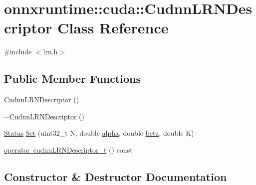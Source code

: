 \hypertarget{classonnxruntime_1_1cuda_1_1CudnnLRNDescriptor}{}\section{onnxruntime\+:\+:cuda\+:\+:Cudnn\+L\+R\+N\+Descriptor Class Reference}
\label{classonnxruntime_1_1cuda_1_1CudnnLRNDescriptor}


{\ttfamily \#include $<$lrn.\+h$>$}

\subsection*{Public Member Functions}
\begin{DoxyCompactItemize}
\item 
\mbox{\hyperlink{classonnxruntime_1_1cuda_1_1CudnnLRNDescriptor_a598f4a66afc45a75c4c8edf863a0514f}{Cudnn\+L\+R\+N\+Descriptor}} ()
\item 
\mbox{\hyperlink{classonnxruntime_1_1cuda_1_1CudnnLRNDescriptor_ac02e80017f5841d5a864269db0e8d437}{$\sim$\+Cudnn\+L\+R\+N\+Descriptor}} ()
\item 
\mbox{\hyperlink{classonnxruntime_1_1common_1_1Status}{Status}} \mbox{\hyperlink{classonnxruntime_1_1cuda_1_1CudnnLRNDescriptor_afef51817e25778067c60d5de09fea530}{Set}} (uint32\+\_\+t N, double \mbox{\hyperlink{mlasi_8h_a1763355f32e1812e5cb3a0080e7cca12}{alpha}}, double \mbox{\hyperlink{mlasi_8h_a5fd37d216981b4cd9a19e29b5acd48d4}{beta}}, double K)
\item 
\mbox{\hyperlink{classonnxruntime_1_1cuda_1_1CudnnLRNDescriptor_acdcc06e1285ed4deebe296910258ffab}{operator cudnn\+L\+R\+N\+Descriptor\+\_\+t}} () const
\end{DoxyCompactItemize}


\subsection{Constructor \& Destructor Documentation}
\mbox{\label{classonnxruntime_1_1cuda_1_1CudnnLRNDescriptor_a598f4a66afc45a75c4c8edf863a0514f}} 
